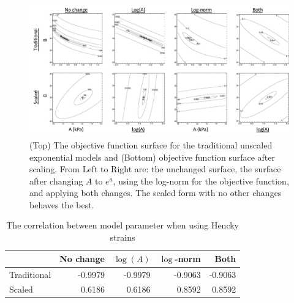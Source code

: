     
\begin{figure}
\centering
\includegraphics[width=6.5in]{Figures/objfunctionsurfaces}
\caption{(Top) The objective function surface for the traditional unscaled exponential models and (Bottom) objective function surface after scaling. From Left to Right are: the unchanged surface, the surface after changing $A$ to $e^{a}$, using the log-norm for the objective function, and applying both changes. The scaled form with no other changes behaves the best.}
\label{fig:objfunctionsurfaces}
\end{figure} 


\begin{table}
\caption{The correlation between model parameter when using Hencky strains}
\begin{center}
\label{tb:ABcorrelation}
\begin{tabular}{|l|rrrr|}
\hline
			& No change	& $\log(A)$	& $\log$-norm	& Both \\
\hline
Traditional	& -0.9979	& -0.9979	& -0.9063		& -0.9063 \\
Scaled 		& 0.6186	& 0.6186	& 0.8592		& 0.8592 \\
\hline
\end{tabular}
\end{center}
\end{table}




